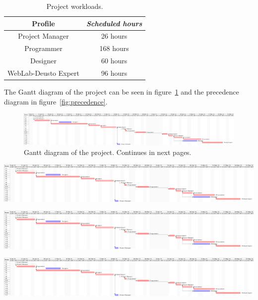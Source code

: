 \begin{table}[h]
	\centering
	\caption{Project workloads.}\label{tab:work}
	\begin{tabular}{cc}
		\toprule
		\textbf{Profile} & \emph{Scheduled hours} \\
		\midrule
		Project Manager			&	26 hours	\\
		Programmer				&	168 hours	\\
		Designer				&	60 hours	\\
		WebLab-Deusto Expert	&	96 hours	\\
		\bottomrule
	\end{tabular}
\end{table}

The Gantt diagram of the project can be seen in figure~\ref{fig:gantt} and the precedence diagram in
figure~\ref{fig:precedence}.

\clearpage
\begin{figure}
	\centering
	\includegraphics[trim=0in 0in 26in 0in, clip, angle=90]{fig/gantt}
	\caption[Gantt diagram of the project.]{Gantt diagram of the project. Continues in next
	pages.}\label{fig:gantt}
\end{figure}
\clearpage

\begin{center}
	\includegraphics[trim=7.82in 0in 17in 0in, clip, angle=90]{fig/gantt}
	\clearpage

	\includegraphics[trim=16.82in 0in 8in 0in, clip, angle=90]{fig/gantt}
	\clearpage

	\includegraphics[trim=25.82in 0in 0in 0in, clip, angle=90]{fig/gantt}
\end{center}
\clearpage

